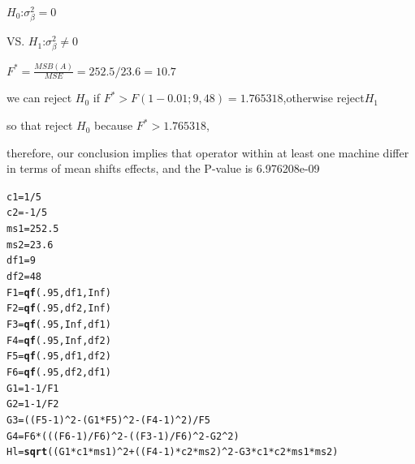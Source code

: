 \documentclass{article}\usepackage[]{graphicx}\usepackage[]{color}
\makeatletter
\newcommand{\hlnum}[1]{\textcolor[rgb]{0.686,0.059,0.569}{#1}}%
\newcommand{\hlopt}[1]{\textcolor[rgb]{0,0,0}{#1}}%
\newcommand{\hlstd}[1]{\textcolor[rgb]{0.345,0.345,0.345}{#1}}%
\newcommand{\hlkwb}[1]{\textcolor[rgb]{0.69,0.353,0.396}{#1}}%
\newcommand{\hlkwd}[1]{\textcolor[rgb]{0.737,0.353,0.396}{\textbf{#1}}}%
\newenvironment{kframe}{%
 \def\at@end@of@kframe{}%
 \ifinner\ifhmode%
  \def\at@end@of@kframe{\end{minipage}}%
  \begin{minipage}{\columnwidth}%
 \fi\fi%
 \def\FrameCommand##1{\hskip\@totalleftmargin \hskip-\fboxsep
 \colorbox{shadecolor}{##1}\hskip-\fboxsep
     \hskip-\linewidth \hskip-\@totalleftmargin \hskip\columnwidth}%
 \MakeFramed {\advance\hsize-\width
   \@totalleftmargin\z@ \linewidth\hsize
   \@setminipage}}%
 {\par\unskip\endMakeFramed%
 \at@end@of@kframe}
\newenvironment{knitrout}{}{} %
\makeatother
\begin{document}
\begin{enumerate}[(a)]
\begin{center}
$H_0$:$\sigma^2_\beta = 0$

VS. $H_1$:$\sigma^2_\beta \ne 0$

$F^*=\frac{MSB(A)}{MSE} = 252.5/23.6  = 10.7$

we can reject $H_0$ if $F^* > F(1-0.01;9,48)=1.765318$,otherwise reject$H_1$

so that reject $H_0$ because $F^*>1.765318$,

therefore, our conclusion implies that operator within at least one machine differ in terms of mean shifts effects, and the P-value is 6.976208e-09
\end{center}

\begin{knitrout}
\color{fgcolor}\begin{kframe}
\begin{alltt}
  \hlstd{c1}\hlkwb{=}\hlnum{1}\hlopt{/}\hlnum{5}
  \hlstd{c2}\hlkwb{=}\hlopt{-}\hlnum{1}\hlopt{/}\hlnum{5}
  \hlstd{ms1}\hlkwb{=}\hlnum{252.5}
  \hlstd{ms2}\hlkwb{=}\hlnum{23.6}
  \hlstd{df1}\hlkwb{=}\hlnum{9}
  \hlstd{df2}\hlkwb{=}\hlnum{48}
  \hlstd{F1}\hlkwb{=}\hlkwd{qf}\hlstd{(}\hlnum{.95}\hlstd{,df1,}\hlnum{Inf}\hlstd{)}
  \hlstd{F2}\hlkwb{=}\hlkwd{qf}\hlstd{(}\hlnum{.95}\hlstd{,df2,}\hlnum{Inf}\hlstd{)}
  \hlstd{F3}\hlkwb{=}\hlkwd{qf}\hlstd{(}\hlnum{.95}\hlstd{,}\hlnum{Inf}\hlstd{,df1)}
  \hlstd{F4}\hlkwb{=}\hlkwd{qf}\hlstd{(}\hlnum{.95}\hlstd{,}\hlnum{Inf}\hlstd{,df2)}
  \hlstd{F5}\hlkwb{=}\hlkwd{qf}\hlstd{(}\hlnum{.95}\hlstd{,df1,df2)}
  \hlstd{F6}\hlkwb{=}\hlkwd{qf}\hlstd{(}\hlnum{.95}\hlstd{,df2,df1)}
  \hlstd{G1}\hlkwb{=}\hlnum{1}\hlopt{-}\hlnum{1}\hlopt{/}\hlstd{F1}
  \hlstd{G2}\hlkwb{=}\hlnum{1}\hlopt{-}\hlnum{1}\hlopt{/}\hlstd{F2}
  \hlstd{G3}\hlkwb{=}\hlstd{((F5}\hlopt{-}\hlnum{1}\hlstd{)}\hlopt{^}\hlnum{2}\hlopt{-}\hlstd{(G1}\hlopt{*}\hlstd{F5)}\hlopt{^}\hlnum{2}\hlopt{-}\hlstd{(F4}\hlopt{-}\hlnum{1}\hlstd{)}\hlopt{^}\hlnum{2}\hlstd{)}\hlopt{/}\hlstd{F5}
  \hlstd{G4}\hlkwb{=}\hlstd{F6}\hlopt{*}\hlstd{( ((F6}\hlopt{-}\hlnum{1}\hlstd{)}\hlopt{/}\hlstd{F6)}\hlopt{^}\hlnum{2} \hlopt{-} \hlstd{((F3}\hlopt{-}\hlnum{1}\hlstd{)}\hlopt{/}\hlstd{F6)}\hlopt{^}\hlnum{2} \hlopt{-} \hlstd{G2}\hlopt{^}\hlnum{2} \hlstd{)}
  \hlstd{Hl} \hlkwb{=} \hlkwd{sqrt}\hlstd{( (G1}\hlopt{*}\hlstd{c1}\hlopt{*}\hlstd{ms1)}\hlopt{^}\hlnum{2} \hlopt{+} \hlstd{((F4}\hlopt{-}\hlnum{1}\hlstd{)}\hlopt{*}\hlstd{c2}\hlopt{*}\hlstd{ms2)}\hlopt{^}\hlnum{2} \hlopt{-} \hlstd{G3}\hlopt{*}\hlstd{c1}\hlopt{*}\hlstd{c2}\hlopt{*}\hlstd{ms1}\hlopt{*}\hlstd{ms2)}

\end{alltt}
\end{kframe}
\end{knitrout}
\end{enumerate}
\end{document}
